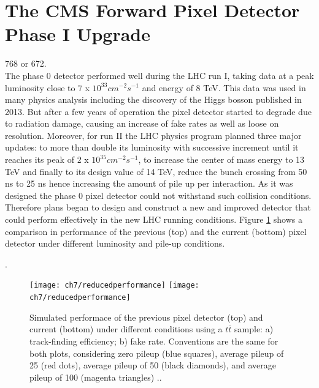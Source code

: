 \section{The CMS Forward Pixel Detector Phase I Upgrade}
{} 768 or 672.\\ 
The phase 0 detector performed well during the LHC run I, taking data at a peak luminosity close to $7$ x $10^{33} cm^{-2} s^{-1}$ and energy of 8 TeV. This data was used in many physics analysis including the discovery of the Higgs bosson published in 2013. But after a few years of operation the pixel detector started to degrade due to radiation damage, causing an increase of fake rates as well as loose on resolution. Moreover, for run II the LHC physics program planned three major updates: to more than double its luminosity with successive increment until it reaches its peak of $2$ x $10^{35} cm^{-2} s^{-1}$, to increase the center of mass energy to 13 TeV and finally to its design value of 14 TeV, reduce the bunch crossing from 50 ns to 25 ns hence increasing the amount of pile up per interaction. As it was designed the phase 0 pixel detector could not withstand such collision conditions. Therefore plans began to design and construct a new and improved detector that could perform effectively in the new LHC running conditions. Figure \ref{redperf} shows a comparison in performance of the previous (top) and the current (bottom) pixel detector under different luminosity  and pile-up conditions.

\tautau. \dt %

\begin{figure}[!h]
	\centering
	\texttt{[image: ch7/reducedperformance]}
	\texttt{[image: ch7/reducedperformance]}
	\caption[Simulated performance comparison of previous and current]{Simulated performace of the previous pixel detector (top) and current (bottom) under different conditions using a $t\bar{t}$ sample: a) track-finding efficiency; b) fake rate. Conventions are the same for both plots, considering zero pileup (blue squares), average pileup of 25 (red dots), average pileup of 50 (black diamonds), and average pileup of 100 (magenta triangles) {}.\cite{pix_tdr}.}
	\label{redperf}
\end{figure}

